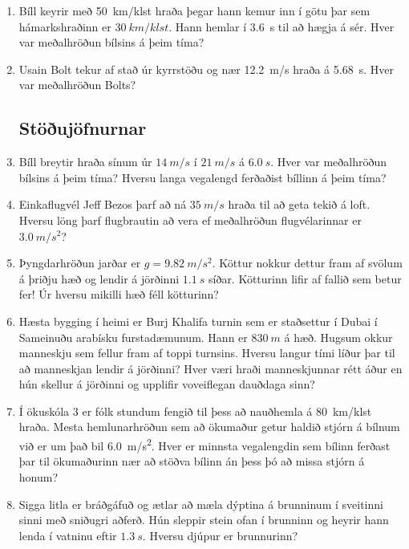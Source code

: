 \begin{enumerate}[label = \textbf{Dæmi \thechapter.\arabic*.}]
\item Bíll keyrir með \SI{50}{km/klst} hraða  þegar hann kemur inn í götu þar sem hámarkshraðinn er $\SI{30}{km/klst}$. Hann hemlar í \SI{3.6}{s} til að hægja á sér. Hver var meðalhröðun bílsins á þeim tíma?

\item Usain Bolt tekur af stað úr kyrrstöðu og nær \SI{12.2}{m/s} hraða á \SI{5.68}{s}. Hver var meðalhröðun Bolts?

\subsection*{Stöðujöfnurnar}

\item Bíll breytir hraða sínum úr $\SI{14}{m/s}$ í $\SI{21}{m/s}$ á $\SI{6.0}{s}$. Hver var meðalhröðun bílsins á þeim tíma? Hversu langa vegalengd ferðaðist bíllinn á þeim tíma?

\item Einkaflugvél Jeff Bezos þarf að ná $\SI{35}{m/s}$ hraða til að geta tekið á loft. Hversu löng þarf flugbrautin að vera ef meðalhröðun flugvélarinnar er $\SI{3.0}{m/s^2}$?

\item Þyngdarhröðun jarðar er $g = \SI{9.82}{m/s^2}$. Köttur nokkur dettur fram af svölum á þriðju hæð og lendir á jörðinni $\SI{1.1}{s}$ síðar. Kötturinn lifir af fallið sem betur fer! Úr hversu mikilli hæð féll kötturinn?

\item Hæsta bygging í heimi er Burj Khalifa turnin sem er staðsettur í Dubai í Sameinuðu arabísku furstadæmunum. Hann er $\SI{830}{m}$ á hæð. Hugsum okkur manneskju sem fellur fram af toppi turnsins. Hversu langur tími líður þar til að manneskjan lendir á jörðinni? Hver væri hraði manneskjunnar rétt áður en hún skellur á jörðinni og upplifir voveiflegan dauðdaga sinn?

\item Í ökuskóla 3 er fólk stundum fengið til þess að nauðhemla á \SI{80}{km/klst} hraða.
Mesta hemlunarhröðun sem að ökumaður getur haldið stjórn á bílnum við er um það bil \SI{6.0}{m/s^2}. Hver er minnsta vegalengdin sem bílinn ferðast þar til ökumaðurinn nær að stöðva bílinn án þess þó að missa stjórn á honum?


\item Sigga litla er bráðgáfuð og ætlar að mæla dýptina á brunninum í sveitinni sinni með sniðugri aðferð. Hún sleppir stein ofan í brunninn og heyrir hann lenda í vatninu eftir $\SI{1.3}{s}$. Hversu djúpur er brunnurinn?



\end{enumerate}
